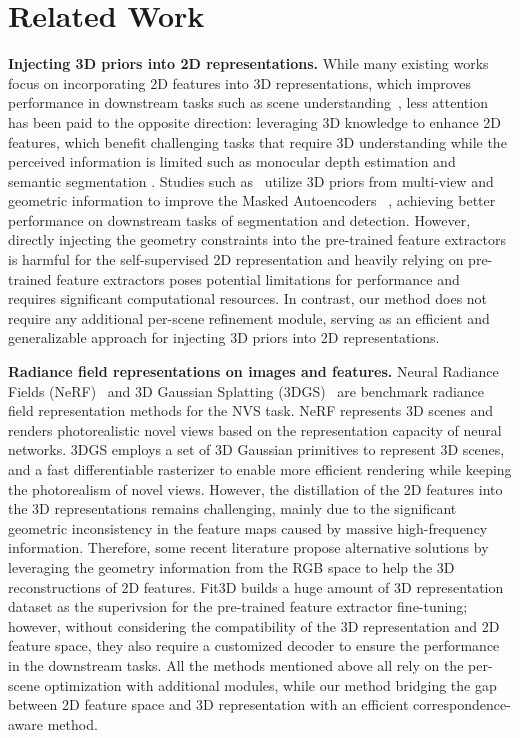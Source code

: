 \section{Related Work}
\textbf{Injecting 3D priors into 2D representations.}
While many existing works focus on incorporating 2D features into 3D representations, which improves performance in downstream tasks such as scene understanding~\citep{Zhi:etal:ICCV2021,ha2022semabs,qin2023langsplat,shi2023language,zhou2024feature,cen2023saga,gu2024egolifter,guo2024semantic}, less attention has been paid to the opposite direction: leveraging 3D knowledge to enhance 2D features, which benefit challenging tasks that require 3D understanding while the perceived information is limited such as monocular depth estimation \citep{stan2023ldm3d,bhat2023zoedepth,piccinelli2024unidepth,Chatterjee_2024_CVPR,moon2023ground} and semantic segmentation \citep{wang2023one,sun2023corrmatch}. Studies such as~\citep{bachmann2022multimae,zhou2024feature} utilize 3D priors from multi-view and geometric information to improve the Masked Autoencoders ~\citep{MaskedAutoencoders2021}, achieving better performance on downstream tasks of segmentation and detection. 
However, directly injecting the geometry constraints into the pre-trained feature extractors is harmful for the self-supervised 2D representation and  heavily relying on pre-trained feature extractors poses potential limitations for performance and requires significant computational resources. In contrast, our method does not require any additional per-scene refinement module, serving as an efficient and generalizable approach for injecting 3D priors into 2D representations. 

\textbf{Radiance field representations on images and features.}
% 
Neural Radiance Fields (NeRF)~\citep{mildenhall2020nerf} and 3D Gaussian Splatting (3DGS)~\citep{mildenhall2020nerf} are benchmark radiance field representation methods for the NVS task.
NeRF represents 3D scenes and renders photorealistic novel views based on the representation capacity of neural networks. 3DGS employs a set of 3D Gaussian primitives to represent 3D scenes, and a fast differentiable rasterizer to enable more efficient rendering while keeping the photorealism of novel views.
However, the distillation of the 2D features into the 3D representations remains challenging, mainly due to the significant geometric inconsistency in the feature maps caused by massive high-frequency information. Therefore, some recent literature \citep{zhou2024feature, kobayashi2022distilledfeaturefields,Siddiqui_2023_CVPR,fan2022nerf,lerf2023} propose alternative solutions by leveraging the geometry information from the RGB space to help the 3D reconstructions of 2D features. Fit3D \citep{yue2024improving} builds a huge amount of 3D representation dataset as the superivsion for the pre-trained feature extractor fine-tuning; however, without considering the compatibility of the 3D representation and 2D feature space, they also require a customized decoder to ensure the performance in the downstream tasks. All the methods mentioned above all rely on the per-scene optimization with additional modules, while our method bridging the gap between 2D feature space and 3D representation with an efficient correspondence-aware method.   

